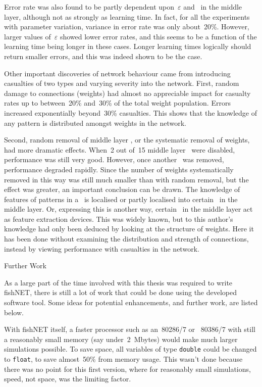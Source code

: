 Error rate was also found to be partly dependent upon~$\varepsilon$
and \neus\ in the middle layer, although not as strongly as learning
time.
In fact, for all the experiments with parameter variation, variance
in error rate was only about~20\%.
However, larger values of~$\varepsilon$ showed lower error rates,
and this seems to be a function of the learning time being longer in
these cases.
Longer learning times logically should return smaller errors, and
this was indeed shown to be the case.

Other important discoveries of network behaviour came from
introducing casualties of two types and varying severity into the
network.
First, random damage to connections (weights) had almost no
appreciable impact for casualty rates up to between~20\% and~30\% 
of the total weight population.
Errors increased exponentially beyond~30\% casualties.
This shows that the knowledge of any pattern is distributed amongst
weights in the network.

Second, random removal of middle layer \neus, or the systematic
removal of weights, had more dramatic effects.
When~2 out of~15 middle layer \neus\ were disabled, performance was
still very good.
However, once another \neu\ was removed, performance degraded
rapidly.
Since the number of weights systematically removed in this way was
still much smaller than with random removal, but the effect was
greater, an important conclusion can be drawn.
The knowledge of features of patterns in a \nn\ is localised or
partly localised into certain \neus\ in the middle layer.
Or, expressing this is another way, certain \neus\ in the middle
layer act as feature extraction devices.
This was widely known, but to this author's knowledge had only been
deduced by looking at the structure of weights.
Here it has been done without examining the distribution and
strength of connections, instead by viewing performance with
casualties in the network.

\sec Further Work

As a large part of the time involved with this thesis was required
to write fishNET, there is still a lot of work that could be done
using the developed software tool.
Some ideas for potential enhancements, and further work, are listed
below.

With fishNET itself, a faster processor such as an~80286/7 or~ 80386/7 
with still a reasonably small memory (say under~2~Mbytes)
would make much larger simulations possible.
To save space, all variables of type {\tt double} could be changed
to {\tt float}, to save almost~50\% from memory usage.
This wasn't done because there was no point for this first version, 
where for reasonably small simulations, speed, not space, was the
limiting factor.

